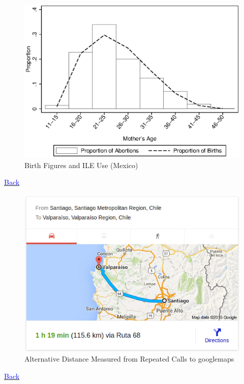 \documentclass[10pt,letterpaper,subeqn]{beamer}
\begin{document}
\begin{frame}[label=MexicoDesc]

\end{frame}

\begin{frame}[label=empirA1]
\begin{figure}
\begin{center}
\caption{Birth Figures and ILE Use (Mexico)}
\includegraphics[scale=0.7]{./figures/birthDescriptives.eps}
\end{center}
\end{figure}
\hyperlink{empirB}{\textcolor{blue}{Back}}
\end{frame}


\begin{frame}[label=distance]
\begin{figure}
\begin{center}
\caption{Alternative Distance Measured from Repeated Calls to googlemaps}
\includegraphics[scale=0.5]{./figures/mapDistance.png}
\end{center}
\end{figure}
\hyperlink{robust}{\textcolor{blue}{Back}}
\end{frame}
\end{document}
